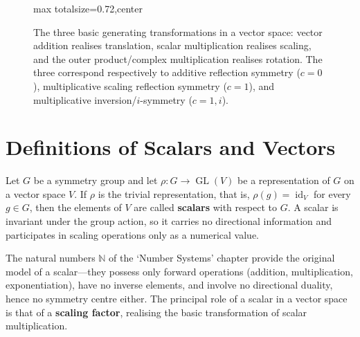 \begin{figure}[htbp]
\centering
\begin{adjustbox}{max totalsize={\linewidth}{0.72\textheight},center}
\end{adjustbox}
\caption{The three basic generating transformations in a vector space: vector addition realises translation, scalar multiplication realises scaling, and the outer product/complex multiplication realises rotation. The three correspond respectively to additive reflection symmetry ($c=0$), multiplicative scaling reflection symmetry ($c=1$), and multiplicative inversion/$i$-symmetry ($c=1,i$).}
\label{fig:three_transformations_vector}
\end{figure}
\section{\texorpdfstring{Definitions of Scalars and Vectors}{Definitions of Scalars and Vectors}}

\begin{definition}[Scalar]\label{def:scalar}
Let $G$ be a symmetry group and let $\rho: G \to \operatorname{GL}(V)$ be a representation of $G$ on a vector space $V$. If $\rho$ is the trivial representation, that is, $\rho(g) = \operatorname{id}_V$ for every $g \in G$, then the elements of $V$ are called \textbf{scalars} with respect to $G$. A scalar is invariant under the group action, so it carries no directional information and participates in scaling operations only as a numerical value.

The natural numbers $\mathbb{N}$ of the `Number Systems' chapter provide the original model of a scalar---they possess only forward operations (addition, multiplication, exponentiation), have no inverse elements, and involve no directional duality, hence no symmetry centre either. The principal role of a scalar in a vector space is that of a \textbf{scaling factor}, realising the basic transformation of scalar multiplication.
\end{definition}

